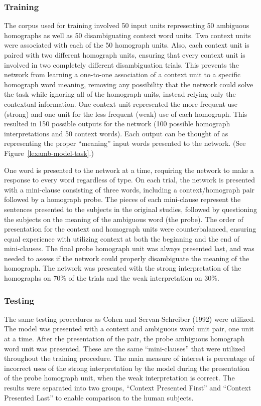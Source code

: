 \subsubsection{Training}
The corpus used for training involved 50 input units representing 50 ambiguous homographs as well as 50 disambiguating context word units.  Two context units were associated with each of the 50 homograph units. Also, each context unit is paired with two different homograph units, ensuring that every context unit is involved in two completely different disambiguation trials.  This prevents the network from learning a one-to-one association of a context unit to a specific homograph word meaning, removing any possibility that the network could solve the task while ignoring all of the homograph units, instead relying only the contextual information.  One context unit represented the more frequent use (strong) and one unit for the less frequent (weak) use of each homograph.  This resulted in 150 possible outputs for the network (100 possible homograph interpretations and 50 context words).  Each output can be thought of as representing the proper ``meaning'' input words presented to the network.  (See Figure~\ref{lexamb-model-task}.)  %

One word is presented to the network at a time, requiring the network to make a response to every word regardless of type.  On each trial, the network is presented with a mini-clause consisting of three words, including a context/homograph pair followed by a homograph probe. The pieces of each mini-clause represent the sentences presented to the subjects in the original studies, followed by questioning the subjects on the meaning of the ambiguous word (the probe).  The order of presentation for the context and homograph units were counterbalanced, ensuring equal experience with utilizing context at both the beginning and the end of mini-clauses.  The final probe homograph unit was always presented last, and was needed to assess if the network could properly disambiguate the meaning of the homograph. The network was presented with the strong interpretation of the homographs on 70\% of the trials and the weak interpretation on 30\%.

\subsubsection{Testing}
The same testing procedures as Cohen and Servan-Schreiber (1992) were utilized.  The model was presented with a context and ambiguous word unit pair, one unit at a time. After the presentation of the pair, the probe ambiguous homograph word unit was presented.  These are the same ``mini-clauses'' that were utilized throughout the training procedure. The main measure of interest is percentage of incorrect uses of the strong interpretation by the model during the presentation of the probe homograph unit, when the weak interpretation is correct.  The results were separated into two groups, ``Context Presented First'' and ``Context Presented Last'' to enable comparison to the human subjects.


